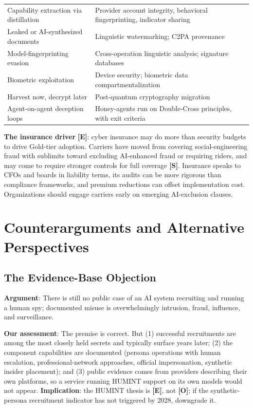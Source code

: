 \documentclass[11pt,letterpaper]{article}
\begin{document}
{\begin{longtable}{L{5.2cm}L{7.6cm}}
Capability extraction via distillation & Provider account integrity, behavioral fingerprinting, indicator sharing \\
Leaked or AI-synthesized documents & Linguistic watermarking; C2PA provenance \\
Model-fingerprinting evasion & Cross-operation linguistic analysis; signature databases \\
Biometric exploitation & Device security; biometric data compartmentalization \\
Harvest now, decrypt later & Post-quantum cryptography migration \\*
Agent-on-agent deception loops & Honey-agents run on Double-Cross principles, with exit criteria \\
\bottomrule
\end{longtable}}

\textbf{The insurance driver} \textbf{[E]}: cyber insurance may do more than security budgets to drive Gold-tier adoption. Carriers have moved from covering social-engineering fraud with sublimits toward excluding AI-enhanced fraud or requiring riders, and may come to require stronger controls for full coverage \textbf{[S]}. Insurance speaks to CFOs and boards in liability terms, its audits can be more rigorous than compliance frameworks, and premium reductions can offset implementation cost. Organizations should engage carriers early on emerging AI-exclusion clauses.

\section{Counterarguments and Alternative Perspectives}\label{sec:counter}

\subsection{The Evidence-Base Objection}

\textbf{Argument}: There is still no public case of an AI system recruiting and running a human spy; documented misuse is overwhelmingly intrusion, fraud, influence, and surveillance.

\textbf{Our assessment}: The premise is correct. But (1) successful recruitments are among the most closely held secrets and typically surface years later; (2) the component capabilities are documented (persona operations with human escalation, professional-network approaches, official impersonation, synthetic insider placement); and (3) public evidence comes from providers describing their own platforms, so a service running HUMINT support on its own models would not appear. \textbf{Implication}: the HUMINT thesis is \textbf{[E]}, not \textbf{[O]}; if the synthetic-persona recruitment indicator has not triggered by 2028, downgrade it.
\end{document}
